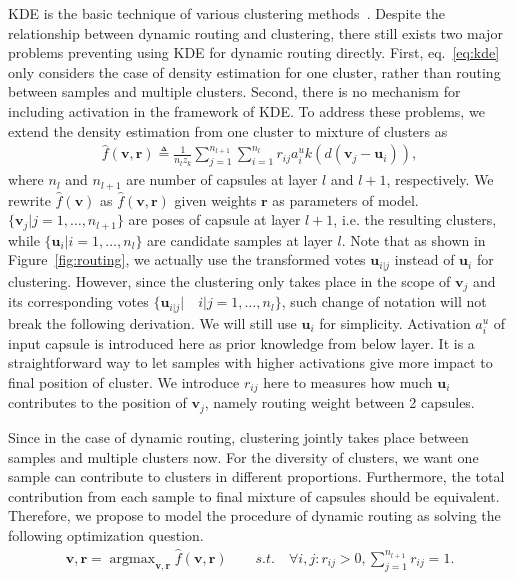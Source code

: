 \documentclass[runningheads]{llncs}
\begin{document}
KDE is the basic technique of various clustering methods~\cite{schwander2013learning}. Despite the relationship between dynamic routing and clustering, there still exists two major problems preventing using KDE for dynamic routing directly. First, eq.~\ref{eq:kde} only considers the case of density estimation for one cluster, rather than routing between samples and multiple clusters. Second, there is no mechanism for including activation in the framework of KDE. To address these problems, we extend the density estimation from one cluster to mixture of clusters as
\begin{align}
\label{eq:kdem}
\hat{f}(\boldsymbol{v},\boldsymbol{r})\triangleq\frac{1}{n_lz_k}\sum\limits_{j=1}^{n_{l+1}}\sum\limits_{i=1}^{n_l}r_{ij}a_i^uk(d(\boldsymbol{v}_j-\boldsymbol{u}_i)),
\end{align}
where $n_l$ and $n_{l+1}$ are number of capsules at layer $l$ and $l+1$, respectively. We rewrite $\hat{f}(\boldsymbol{v})$ as $\hat{f}(\boldsymbol{v},\boldsymbol{r})$ given weights $\boldsymbol{r}$ as parameters of model. $\{\boldsymbol{v}_j|j=1,\dots,n_{l+1}\}$ are poses of capsule at layer $l+1$, i.e. the resulting clusters, while $\{\boldsymbol{u}_i|i=1,\dots,n_l\}$ are candidate samples at layer $l$. Note that as shown in Figure~\ref{fig:routing}, we actually use the transformed votes $\boldsymbol{u}_{i|j}$ instead of $\boldsymbol{u}_i$ for clustering. However, since the clustering only takes place in the scope of $\boldsymbol{v}_j$ and its corresponding votes $\{\boldsymbol{u}_{i|j}|\quad{i}|j=1,\dots,n_l\}$, such change of notation will not break the following derivation. We will still use $\boldsymbol{u}_i$ for simplicity. Activation $a_i^u$ of input capsule is introduced here as prior knowledge from below layer. It is a straightforward way to let samples with higher activations give more impact to final position of cluster. We introduce $r_{ij}$ here to measures how much $\boldsymbol{u}_i$ contributes to the position of $\boldsymbol{v}_j$, namely routing weight between 2 capsules. 

Since in the case of dynamic routing, clustering jointly takes place between samples and multiple clusters now. For the diversity of clusters, we want one sample can contribute to clusters in different proportions. Furthermore, the total contribution from each sample to final mixture of capsules should be equivalent. Therefore, we propose to model the procedure of dynamic routing as solving the following optimization question.\begin{align}
\label{eq:opt}
\boldsymbol{v},\boldsymbol{r}=\mathop{\arg\max}_{\boldsymbol{v}, \boldsymbol{r}}\hat{f}(\boldsymbol{v},\boldsymbol{r}) \qquad s.t.\quad\forall{i,j}:r_{ij}>0,\sum\limits_{j=1}^{n_{l+1}}r_{ij}=1.
\end{align}
\end{document}
